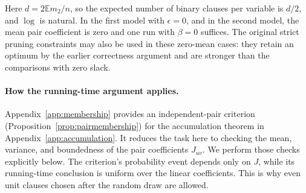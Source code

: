 \documentclass[11pt,a4paper]{article}
\theoremstyle{definition}
\theoremstyle{remark}
\newcommand{\E}{\mathbb E}
\begin{document}
Here $d=2\E m_2/n$, so the expected number of binary clauses per variable
is $d/2$, and $\log$ is natural. In the first model with $\epsilon=0$,
and in the second model, the mean pair coefficient is zero and one run
with $\beta=0$ suffices. The original strict pruning constraints may also
be used in these zero-mean cases: they retain an optimum by the earlier
correctness argument and are stronger than the comparisons with zero slack.

\paragraph{How the running-time argument applies.}
Appendix~\ref{app:membership} provides an independent-pair criterion
(Proposition~\ref{prop:pairmembership}) for the accumulation theorem in
Appendix~\ref{app:accumulation}. It reduces the task here to checking the
mean, variance, and boundedness of the pair coefficients $J_{uv}$.
We perform those checks explicitly below. The criterion's probability
event depends only on $J$, while its running-time conclusion is uniform
over the linear coefficients. This is why even unit clauses chosen after
the random draw are allowed.
\end{document}
